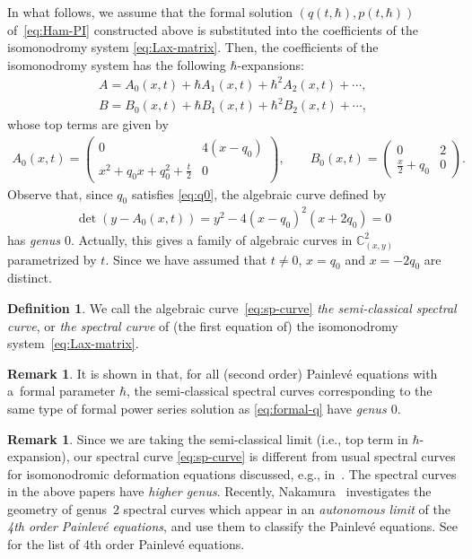 \documentclass[pdftex]{sigma}
\theoremstyle{definition}
\newtheorem{Def}[thm]{Definition}
\newtheorem{rem}[thm]{Remark}
\numberwithin{equation}{section}
\begin{document}
In what follows, we assume that the formal solution
$(q(t,\hbar), p(t,\hbar))$ of~\eqref{eq:Ham-PI}
constructed above is substituted into the coef\/f\/icients
of the isomonodromy system \eqref{eq:Lax-matrix}.
Then, the coef\/f\/icients of the isomonodromy system has the following
$\hbar$-expansions:
\begin{gather*}
A   =   A_{0}(x,t) + \hbar A_{1}(x,t) + \hbar^{2} A_{2}(x,t) + \cdots, \\
B   =   B_{0}(x,t) + \hbar B_{1}(x,t) + \hbar^{2} B_{2}(x,t) + \cdots,
\end{gather*}
whose top terms are given by
\begin{gather*}
A_{0}(x,t)   =
\begin{pmatrix}
  0
&
 4(x-q_{0})
\\
\displaystyle x^{2} + q_{0} x + q_{0}^{2} + \frac{t}{2}
&
  0
\end{pmatrix}, \qquad
B_{0}(x,t)    =
\begin{pmatrix}
  0
&
  2
\\
\displaystyle \frac{x}{2}+q_{0}
&
   0
\end{pmatrix}.
\end{gather*}
Observe that, since $q_{0}$ satisf\/ies \eqref{eq:q0},
the algebraic curve def\/ined by
\begin{gather} \label{eq:sp-curve}
\det  (y - A_{0}(x,t)  ) =
y^{2} - 4  ( x-q_{0}  )^{2}  ( x+2q_{0}  )
= 0
\end{gather}
has {\em genus $0$}. Actually, this gives a family of algebraic
curves in ${\mathbb C}^{2}_{(x,y)}$
parametrized by $t$. Since we have assumed that
$t \ne 0$, $x=q_{0}$ and $x=-2q_{0}$ are distinct.

\begin{Def}
We call the algebraic curve~\eqref{eq:sp-curve}
{\em the semi-classical spectral curve}, or
{\em the spectral curve}
of (the f\/irst equation of) the isomonodromy system~\eqref{eq:Lax-matrix}.
\end{Def}

\begin{rem}
It is shown in \cite[Proposition~1.3]{KT-PI} that, for all (second order)
Painlev\'e equations with a~formal parameter $\hbar$,
the semi-classical spectral curves corresponding to
the same type of formal power series solution
as \eqref{eq:formal-q} have {\em genus $0$}.
\end{rem}

\begin{rem}
Since we are taking the semi-classical limit
(i.e., top term in $\hbar$-expansion),
our spectral curve \eqref{eq:sp-curve} is dif\/ferent from
usual spectral curves for isomonodromic deformation equations
discussed, e.g., in~\cite{Olsha, Takasaki}.
The spectral curves in the above papers have {\em higher genus}.
Recently, Nakamura~\cite{Nakamura} investigates
the geometry of genus~$2$ spectral curves which appear
in an {\em autonomous limit} of the
{\em 4th order Painlev\'e equations},
and use them to classify the Painlev\'e equations.
See \cite{KNS} for the list of 4th order Painlev\'e equations.
\end{rem}
\end{document}
